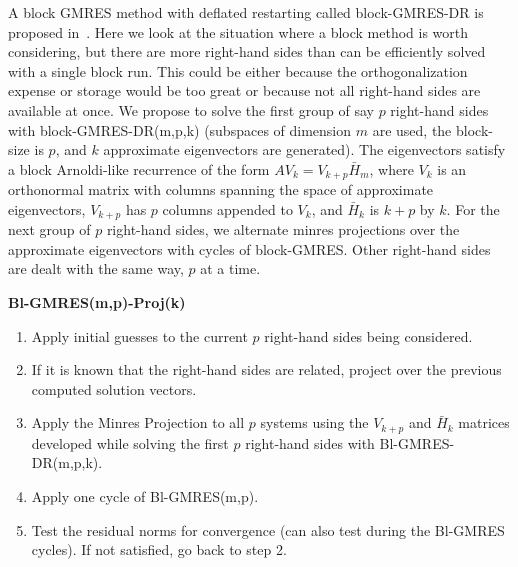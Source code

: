 \documentclass[final]{siamltex}
\begin{document}
A block GMRES method with deflated restarting called block-GMRES-DR is proposed in~\cite{bgdr}.  Here we look at the situation where a block method is worth considering, but there are more right-hand sides than can be efficiently solved with a single block run.  This could be either because the orthogonalization expense or storage would be too great or because not all right-hand sides are available at once.  We propose to solve the first group of say $p$ right-hand sides with block-GMRES-DR(m,p,k) (subspaces of dimension $m$ are used, the block-size is $p$, and $k$ approximate eigenvectors are generated).  The eigenvectors satisfy a block Arnoldi-like recurrence of the form $AV_k = V_{k+p}\bar H_m$, where $V_{k}$ is an orthonormal matrix with columns spanning the space of approximate eigenvectors, $V_{k+p}$ has $p$ columns appended to $V_k$, and $\bar H_k$ is $k+p$ by $k$.  For the next group of $p$ right-hand sides, we alternate minres projections over the approximate eigenvectors with cycles of block-GMRES.  Other right-hand sides are dealt with the same way, $p$ at a time.

\vspace{.10in}
\begin{center}
\textbf{Bl-GMRES(m,p)-Proj(k)}
\end{center}
\begin{enumerate}
 \item Apply initial guesses to the current $p$ right-hand sides being considered. 
 \item If it is known that the right-hand sides are related, project over the previous computed solution vectors.
 \item Apply the Minres Projection to all $p$ systems using the $V_{k+p}$ and $\bar H_k$ matrices developed while solving the first $p$ right-hand sides with Bl-GMRES-DR(m,p,k).
 \item Apply one cycle of Bl-GMRES(m,p).
 \item Test the residual norms for convergence (can also test during the Bl-GMRES cycles).  If not satisfied, go back to step 2.
\end{enumerate} 
\vspace{.15in}
\end{document}

